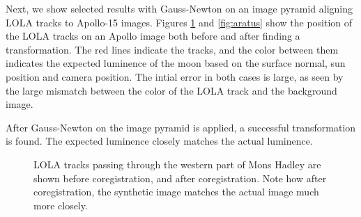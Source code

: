
Next, we show selected results with Gauss-Newton on an image pyramid aligning
LOLA tracks to Apollo-15 images. Figures \ref{fig:monshadley} and \ref{fig:aratus}
show the position of the LOLA tracks on an Apollo image both before and after
finding a transformation. The red lines indicate the tracks, and the color
between them indicates the expected luminence of the moon based on the surface
normal, sun position and camera position. The intial error in both cases is large,
as seen by the large mismatch between the color of the LOLA track and the
background image.

After Gauss-Newton on the image pyramid is applied, a successful transformation is found.
The expected luminence closely matches the actual luminence.

\begin{figure}
	\centering
	\caption{LOLA tracks passing through the western part of Mons Hadley are shown
		 before coregistration, and
		 after coregistration. Note how after
		coregistration, the synthetic image matches the actual image much more closely.}
	\label{fig:monshadley}
\end{figure}

